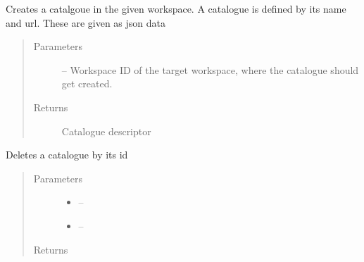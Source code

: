 \documentclass[letterpaper,10pt,english]{sphinxmanual}
\begin{document}
\begin{fulllineitems}
\label{_source/son_editor.impl:son_editor.impl.cataloguesimpl.create_catalogue}
Creates a catalgoue in the given workspace. A catalogue is defined by its name and url. These are given as
json data
\begin{quote}\begin{description}
\item[{Parameters}] \leavevmode
{} -- Workspace ID of the target workspace, where the catalogue should get created.

\item[{Returns}] \leavevmode
Catalogue descriptor

\end{description}\end{quote}

\end{fulllineitems}


\begin{fulllineitems}
\label{_source/son_editor.impl:son_editor.impl.cataloguesimpl.delete}
Deletes a catalogue by its id
\begin{quote}\begin{description}
\item[{Parameters}] \leavevmode\begin{itemize}
\item {} 
 -- 

\item {} 
 -- 

\end{itemize}

\item[{Returns}] \leavevmode


\end{description}\end{quote}

\end{fulllineitems}

\end{document}
